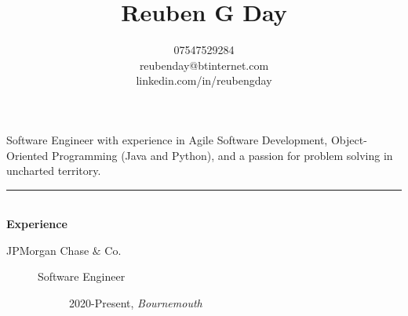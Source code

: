 \documentclass[12pt, a4paper]{article}
\date{}
\title{\vspace{-6ex}Reuben G Day }
\author{07547529284 \\ reubenday@btinternet.com \\ linkedin.com/in/reubengday} %
\begin{document}
\maketitle
\vspace{-5ex}

\begin{center}
  Software Engineer with experience in Agile Software Development, Object-Oriented Programming (Java and Python), and a passion for problem solving in uncharted territory.
\end{center}

\vspace{-2ex}

\noindent\rule{8cm}{0.4pt} \\
\textbf{Experience}
\begin{description}
  \item[JPMorgan Chase $\&$ Co.]\textbf{}
  \begin{description}
    \item[Software Engineer] 2020-Present, \textit{Bournemouth}

  \end{description}

\end{description}

\vspace{-2ex}
\end{document}
